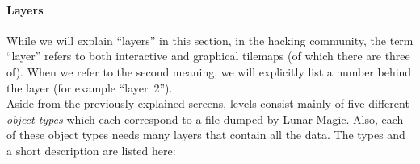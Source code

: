 \paragraph{Layers}
\label{par:layers}

While we will explain ``layers'' in this section, in the hacking
community, the term ``layer'' refers to both interactive and graphical
tilemaps (of which there are three of). When we refer to the second
meaning, we will explicitly list a number behind the layer (for
example ``layer~2''). \\
Aside from the previously explained screens, levels consist mainly of
five different \emph{object types} which each correspond to a file
dumped by Lunar Magic. Also, each of these object types needs many
layers that contain all the data. The types and a short description
are listed here:
